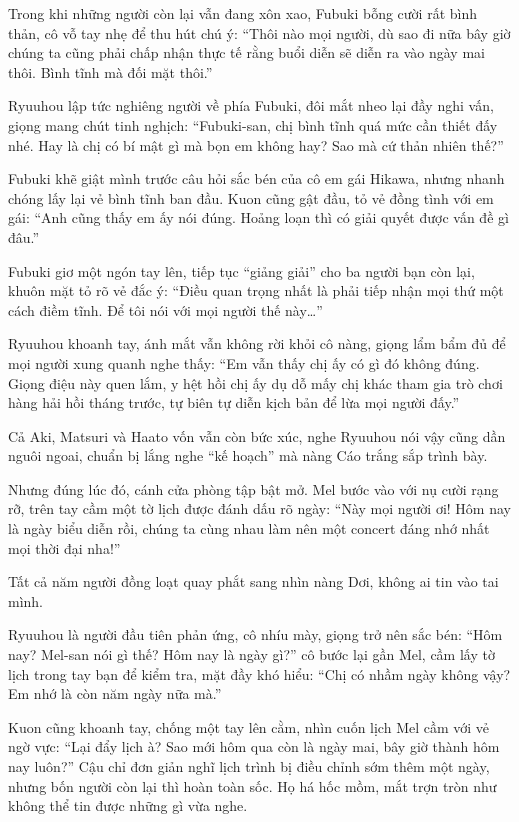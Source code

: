 \documentclass[../main.tex]{subfiles}
\begin{document}
Trong khi những người còn lại vẫn đang xôn xao, Fubuki bỗng cười rất bình thản, cô vỗ tay nhẹ để thu hút chú ý: ``Thôi nào mọi người, dù sao đi nữa bây giờ chúng ta cũng phải chấp nhận thực tế rằng buổi diễn sẽ diễn ra vào ngày mai thôi. Bình tĩnh mà đối mặt thôi.''

Ryuuhou lập tức nghiêng người về phía Fubuki, đôi mắt nheo lại đầy nghi vấn, giọng mang chút tinh nghịch: ``Fubuki-san, chị bình tĩnh quá mức cần thiết đấy nhé. Hay là chị có bí mật gì mà bọn em không hay? Sao mà cứ thản nhiên thế?''

Fubuki khẽ giật mình trước câu hỏi sắc bén của cô em gái Hikawa, nhưng nhanh chóng lấy lại vẻ bình tĩnh ban đầu. Kuon cũng gật đầu, tỏ vẻ đồng tình với em gái: ``Anh cũng thấy em ấy nói đúng. Hoảng loạn thì có giải quyết được vấn đề gì đâu.''

Fubuki giơ một ngón tay lên, tiếp tục ``giảng giải'' cho ba người bạn còn lại, khuôn mặt tỏ rõ vẻ đắc ý: ``Điều quan trọng nhất là phải tiếp nhận mọi thứ một cách điềm tĩnh. Để tôi nói với mọi người thế này\dots''

Ryuuhou khoanh tay, ánh mắt vẫn không rời khỏi cô nàng, giọng lẩm bẩm đủ để mọi người xung quanh nghe thấy: ``Em vẫn thấy chị ấy có gì đó không đúng. Giọng điệu này quen lắm, y hệt hồi chị ấy dụ dỗ mấy chị khác tham gia trò chơi hàng hải hồi tháng trước, tự biên tự diễn kịch bản để lừa mọi người đấy.''

Cả Aki, Matsuri và Haato vốn vẫn còn bức xúc, nghe Ryuuhou nói vậy cũng dần nguôi ngoai, chuẩn bị lắng nghe ``kế hoạch'' mà nàng Cáo trắng sắp trình bày.

Nhưng đúng lúc đó, cánh cửa phòng tập bật mở. Mel bước vào với nụ cười rạng rỡ, trên tay cầm một tờ lịch được đánh dấu rõ ngày: ``Này mọi người ơi! Hôm nay là ngày biểu diễn rồi, chúng ta cùng nhau làm nên một concert đáng nhớ nhất mọi thời đại nha!''

Tất cả năm người đồng loạt quay phắt sang nhìn nàng Dơi, không ai tin vào tai mình.

Ryuuhou là người đầu tiên phản ứng, cô nhíu mày, giọng trở nên sắc bén: ``Hôm nay? Mel-san nói gì thế? Hôm nay là ngày gì?'' cô bước lại gần Mel, cầm lấy tờ lịch trong tay bạn để kiểm tra, mặt đầy khó hiểu: ``Chị có nhầm ngày không vậy? Em nhớ là còn năm ngày nữa mà.''

Kuon cũng khoanh tay, chống một tay lên cằm, nhìn cuốn lịch Mel cầm với vẻ ngờ vực: ``Lại đẩy lịch à? Sao mới hôm qua còn là ngày mai, bây giờ thành hôm nay luôn?'' Cậu chỉ đơn giản nghĩ lịch trình bị điều chỉnh sớm thêm một ngày, nhưng bốn người còn lại thì hoàn toàn sốc. Họ há hốc mồm, mắt trợn tròn như không thể tin được những gì vừa nghe.
\end{document}
